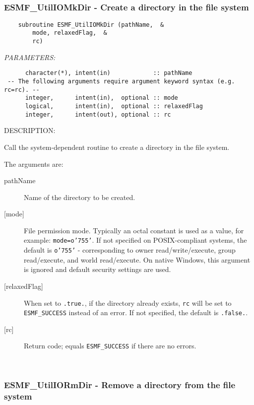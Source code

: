 \mbox{}\hrulefill\ 
 
\subsubsection [ESMF\_UtilIOMkDir] {ESMF\_UtilIOMkDir - Create a directory in the file system}


  
\begin{verbatim}    subroutine ESMF_UtilIOMkDir (pathName,  &
        mode, relaxedFlag,  &
        rc)\end{verbatim}{\em PARAMETERS:}
\begin{verbatim}      character(*), intent(in)            :: pathName
 -- The following arguments require argument keyword syntax (e.g. rc=rc). --
      integer,      intent(in),  optional :: mode
      logical,      intent(in),  optional :: relaxedFlag
      integer,      intent(out), optional :: rc\end{verbatim}
{\sf DESCRIPTION:\\ }


     Call the system-dependent routine to create a directory in the file system.
  
       The arguments are:
       \begin{description}
       \item[pathName]
         Name of the directory to be created.
       \item[{[mode]}]
         File permission mode.  Typically an octal constant is used as a value, for example:
         {\tt mode=o'755'}.  If not specified on POSIX-compliant systems, the default
         is {\tt o'755'} - corresponding to owner read/write/execute,
         group read/execute, and world read/execute.  On native Windows, this argument is
         ignored and default security settings are used.
       \item[{[relaxedFlag]}]
         When set to {\tt .true.}, if the directory already exists, {\tt rc}
         will be set to {\tt ESMF\_SUCCESS} instead of an error.
         If not specified, the default is {\tt .false.}.
       \item[{[rc]}]
         Return code; equals {\tt ESMF\_SUCCESS} if there are no errors.
       \end{description} 
 
\mbox{}\hrulefill\ 
 
\subsubsection [ESMF\_UtilIORmDir] {ESMF\_UtilIORmDir - Remove a directory from the file system}


